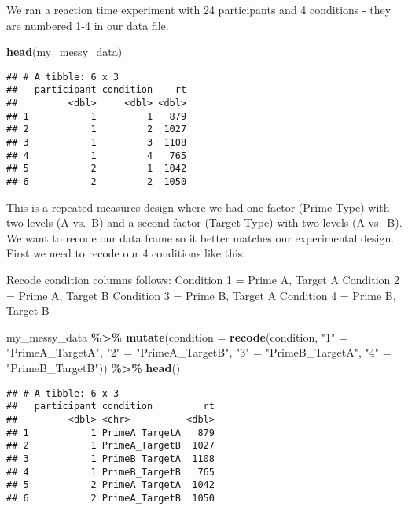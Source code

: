 \documentclass[
]{book}
\newenvironment{Shaded}{\begin{snugshade}}{\end{snugshade}}
\newcommand{\AttributeTok}[1]{\textcolor[rgb]{0.13,0.29,0.53}{#1}}
\newcommand{\FunctionTok}[1]{\textcolor[rgb]{0.13,0.29,0.53}{\textbf{#1}}}
\newcommand{\NormalTok}[1]{#1}
\newcommand{\OtherTok}[1]{\textcolor[rgb]{0.56,0.35,0.01}{#1}}
\newcommand{\SpecialCharTok}[1]{\textcolor[rgb]{0.81,0.36,0.00}{\textbf{#1}}}
\newcommand{\StringTok}[1]{\textcolor[rgb]{0.31,0.60,0.02}{#1}}
\begin{document}
We ran a reaction time experiment with 24 participants and 4 conditions - they are numbered 1-4 in our data file.

\begin{Shaded}
\begin{Highlighting}[]
\FunctionTok{head}\NormalTok{(my\_messy\_data)}
\end{Highlighting}
\end{Shaded}

\begin{verbatim}
## # A tibble: 6 x 3
##   participant condition    rt
##         <dbl>     <dbl> <dbl>
## 1           1         1   879
## 2           1         2  1027
## 3           1         3  1108
## 4           1         4   765
## 5           2         1  1042
## 6           2         2  1050
\end{verbatim}

This is a repeated measures design where we had one factor (Prime Type) with two levels (A vs.~B) and a second factor (Target Type) with two levels (A vs.~B). We want to recode our data frame so it better matches our experimental design. First we need to recode our 4 conditions like this:

Recode condition columns follows: Condition 1 = Prime A, Target A Condition 2 = Prime A, Target B Condition 3 = Prime B, Target A Condition 4 = Prime B, Target B

\begin{Shaded}
\begin{Highlighting}[]
\NormalTok{my\_messy\_data }\SpecialCharTok{\%\textgreater{}\%} 
  \FunctionTok{mutate}\NormalTok{(}\AttributeTok{condition =} \FunctionTok{recode}\NormalTok{(condition,}
                            \StringTok{"1"} \OtherTok{=} \StringTok{"PrimeA\_TargetA"}\NormalTok{,}
                            \StringTok{"2"} \OtherTok{=} \StringTok{"PrimeA\_TargetB"}\NormalTok{, }
                            \StringTok{"3"} \OtherTok{=} \StringTok{"PrimeB\_TargetA"}\NormalTok{, }
                            \StringTok{"4"} \OtherTok{=} \StringTok{"PrimeB\_TargetB"}\NormalTok{)) }\SpecialCharTok{\%\textgreater{}\%}
  \FunctionTok{head}\NormalTok{()}
\end{Highlighting}
\end{Shaded}

\begin{verbatim}
## # A tibble: 6 x 3
##   participant condition         rt
##         <dbl> <chr>          <dbl>
## 1           1 PrimeA_TargetA   879
## 2           1 PrimeA_TargetB  1027
## 3           1 PrimeB_TargetA  1108
## 4           1 PrimeB_TargetB   765
## 5           2 PrimeA_TargetA  1042
## 6           2 PrimeA_TargetB  1050
\end{verbatim}
\end{document}
